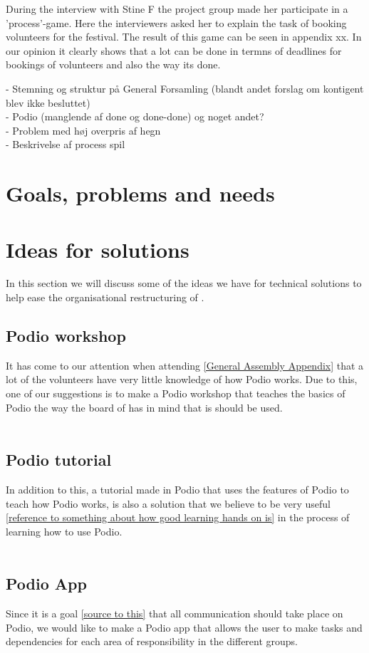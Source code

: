 During the interview with Stine F the project group made her participate in a 'process'-game. Here the interviewers asked her to explain the task of booking volunteers for the festival. The result of this game can be seen in appendix xx. In our opinion it clearly shows that a lot can be done in termns of deadlines for bookings of volunteers and also the way its done.

- Stemning og struktur på General Forsamling (blandt andet forslag om kontigent blev ikke besluttet)\\
- Podio (manglende af done og done-done) og noget andet?\\
- Problem med høj overpris af hegn\\
- Beskrivelse af process spil

\section{Goals, problems and needs}


\section{Ideas for solutions}
In this section we will discuss some of the ideas we have for technical
solutions to help ease the organisational restructuring of \mil.
\subsection{Podio workshop}
It has come to our attention when attending \ref{General Assembly Appendix} that
a lot of the volunteers have very little knowledge of how Podio works. Due to
this, one of our suggestions is to make a Podio workshop that teaches the basics
of Podio the way the board of \mil has in mind that is should be used.
\\
\\
\subsection{Podio tutorial}
In addition to this, a tutorial made in Podio that uses the features of Podio to
teach how Podio works, is also a solution that we believe to be very useful
\ref{reference to something about how good learning hands on is} in the process
of learning how to use Podio.
\\
\\
\subsection{Podio App}
Since it is a goal \ref{source to this} that all communication should take place
on Podio, we would like to make a Podio app that allows the user to make tasks
and dependencies for each area of responsibility in the different groups.
\\
\\

